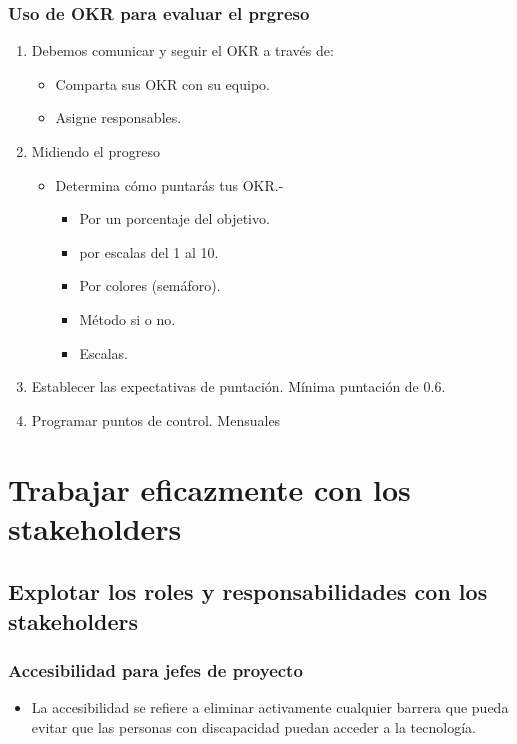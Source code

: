\documentclass[10pt]{book}
\begin{document}
	\subsection{Uso de OKR para evaluar el prgreso}
	\begin{enumerate}[1.]
	\item Debemos comunicar y seguir el OKR  a través de:
	    \begin{itemize}
		\item Comparta sus OKR con su equipo.
		\item Asigne responsables.
	    \end{itemize}

	\item Midiendo el progreso
	    \begin{itemize}
		\item Determina cómo puntarás tus OKR.-
		    \begin{itemize}
			\item Por un porcentaje del objetivo.
			\item por escalas del 1 al 10.
			\item Por colores (semáforo).
			\item Método si o no.
			\item Escalas.
		    \end{itemize}
	    \end{itemize}

	\item Establecer las expectativas de puntación. Mínima puntación de 0.6.
	\item Programar puntos de control. Mensuales 
	\end{enumerate}
	

\chapter{Trabajar eficazmente con los stakeholders}

    \section{Explotar los roles y responsabilidades con los stakeholders}

	\subsection{Accesibilidad para jefes de proyecto}
	    
	    \begin{itemize}
		\item La accesibilidad se refiere a eliminar activamente cualquier barrera que pueda evitar que las personas con discapacidad puedan acceder a la tecnología.
	    \end{itemize}
\end{document}
